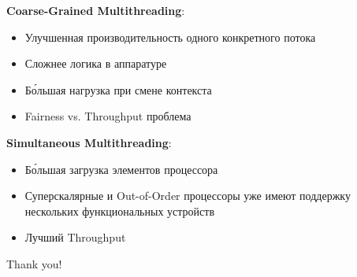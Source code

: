 	\textbf{Coarse-Grained Multithreading}:
	\begin{itemize}
		\item Улучшенная производительность одного конкретного потока
		\item Сложнее логика в аппаратуре
		\item Б\'{о}льшая нагрузка при смене контекста
		\item Fairness vs. Throughput проблема
	\end{itemize}
	

	\textbf{Simultaneous Multithreading}:
	\begin{itemize}
		\item Б\'{о}льшая загрузка элементов процессора
		\item Суперскалярные и Out-of-Order процессоры уже имеют поддержку нескольких функциональных устройств
		\item Лучший Throughput
	\end{itemize}
	
	\newpage
	\thispagestyle{empty}
	\vspace*{\fill}
	\begingroup
	\centering
	{\Huge Thank you!}

	\endgroup
	\vspace*{\fill}

